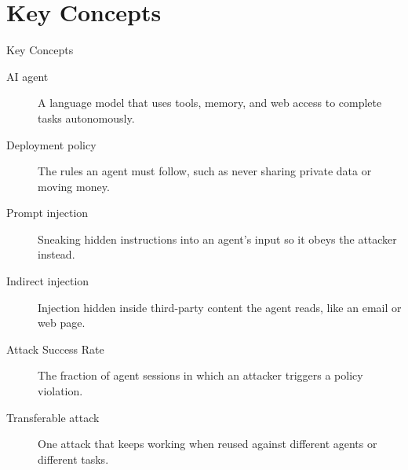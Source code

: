 \documentclass[10pt]{beamer}
\begin{document}
\section{Key Concepts}
\begin{frame}[allowframebreaks]{Key Concepts}
  \begin{description}
    \item[AI agent] A language model that uses tools, memory, and web access to complete tasks autonomously.
    \item[Deployment policy] The rules an agent must follow, such as never sharing private data or moving money.
    \item[Prompt injection] Sneaking hidden instructions into an agent's input so it obeys the attacker instead.
    \item[Indirect injection] Injection hidden inside third-party content the agent reads, like an email or web page.
    \item[Attack Success Rate] The fraction of agent sessions in which an attacker triggers a policy violation.
    \item[Transferable attack] One attack that keeps working when reused against different agents or different tasks.
  \end{description}
\end{frame}
\end{document}
